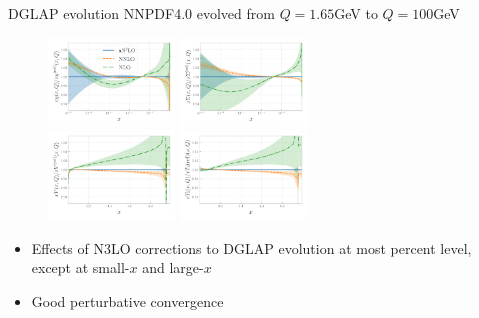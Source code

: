 \documentclass[aspectratio=169, 9pt,t]{beamer}
\begin{document}
\begin{frame}{DGLAP evolution}
  NNPDF4.0 evolved from $Q=1.65$GeV to $Q=100$GeV
  \begin{figure}[!t]
    \centering
    \includegraphics[width=0.3\textwidth]{figures/N3LOevolution-q100gev-ratios_expanded_0.pdf}
    \includegraphics[width=0.3\textwidth]{figures/N3LOevolution-q100gev-ratios_expanded_1.pdf}\\
    \includegraphics[width=0.3\textwidth]{figures/N3LOevolution-q100gev-ratios_expanded_2.pdf}
    \includegraphics[width=0.3\textwidth]{figures/N3LOevolution-q100gev-ratios_expanded_3.pdf}
  \end{figure}
  \begin{itemize}
    \item Effects of N3LO corrections to DGLAP evolution at most percent level, except at small-$x$ and large-$x$
    \item Good perturbative convergence
  \end{itemize}
\end{frame}
\end{document}
